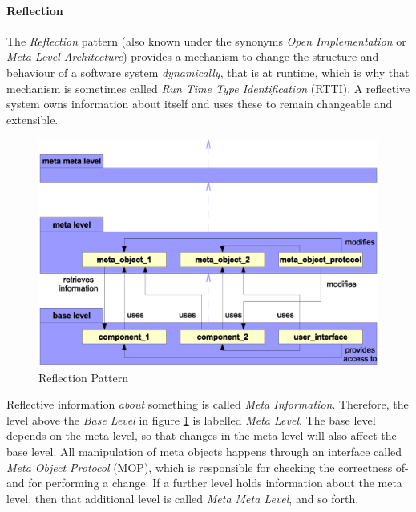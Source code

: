 %
%
%
%
%
%
%

\paragraph{Reflection}
\label{reflection_heading}

The \emph{Reflection} pattern \cite{buschmann} (also known under the synonyms
\emph{Open Implementation} or \emph{Meta-Level Architecture}) provides a
mechanism to change the structure and behaviour of a software system
\emph{dynamically}, that is at runtime, which is why that mechanism is sometimes
called \emph{Run Time Type Identification} (RTTI). A reflective system owns
information about itself and uses these to remain changeable and extensible.

\begin{figure}[ht]
    \begin{center}
        \includegraphics[scale=0.3]{vector/reflection.eps}
        \caption{Reflection Pattern}
        \label{reflection_figure}
    \end{center}
\end{figure}

Reflective information \emph{about} something is called \emph{Meta Information}.
Therefore, the level above the \emph{Base Level} in figure \ref{reflection_figure}
is labelled \emph{Meta Level}. The base level depends on the meta level, so that
changes in the meta level will also affect the base level. All manipulation of
meta objects happens through an interface called \emph{Meta Object Protocol}
(MOP), which is responsible for checking the correctness of- and for performing
a change. If a further level holds information about the meta level, then that
additional level is called \emph{Meta Meta Level}, and so forth.

